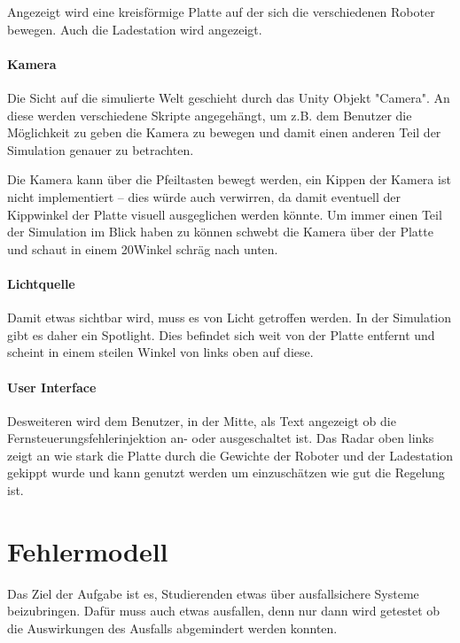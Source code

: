 Angezeigt wird eine kreisf{\"{o}}rmige Platte auf der sich die verschiedenen Roboter bewegen. Auch die
Ladestation wird angezeigt.

\paragraph{Kamera} Die Sicht auf die simulierte Welt geschieht durch das Unity Objekt "Camera". An diese
werden verschiedene Skripte angegeh{\"{a}}ngt, um z.B. dem Benutzer die M{\"{o}}glichkeit zu
geben die Kamera zu bewegen und damit einen anderen Teil der Simulation genauer zu betrachten.

Die Kamera kann {\"{u}}ber die Pfeiltasten bewegt werden, ein Kippen der Kamera ist nicht implementiert --
dies w{\"{u}}rde auch verwirren, da damit eventuell der Kippwinkel der Platte visuell ausgeglichen
werden k{\"{o}}nnte. Um immer einen Teil der Simulation im Blick haben zu k{\"{o}}nnen schwebt die Kamera
{\"{u}}ber der Platte und schaut in einem 20\textdegree Winkel schr{\"{a}}g nach unten.

\paragraph{Lichtquelle} Damit etwas sichtbar wird, muss es von Licht getroffen werden. In der Simulation
gibt es daher ein Spotlight. Dies befindet sich weit von der Platte entfernt und scheint in einem steilen Winkel
von links oben auf diese.

\paragraph{User Interface} Desweiteren wird dem Benutzer, in der Mitte, als Text angezeigt ob die
Fernsteuerungsfehlerinjektion an- oder ausgeschaltet ist. Das Radar oben links zeigt an wie stark die Platte
durch die Gewichte der Roboter und der Ladestation gekippt wurde und kann genutzt werden um einzusch{\"{a}}tzen
wie gut die Regelung ist.


\clearpage
\section{Fehlermodell}\label{fm}
Das Ziel der Aufgabe ist es, Studierenden etwas {\"{u}}ber ausfallsichere Systeme beizubringen. Daf{\"{u}}r
muss auch etwas ausfallen, denn nur dann wird getestet ob die Auswirkungen des Ausfalls abgemindert werden 
konnten.

